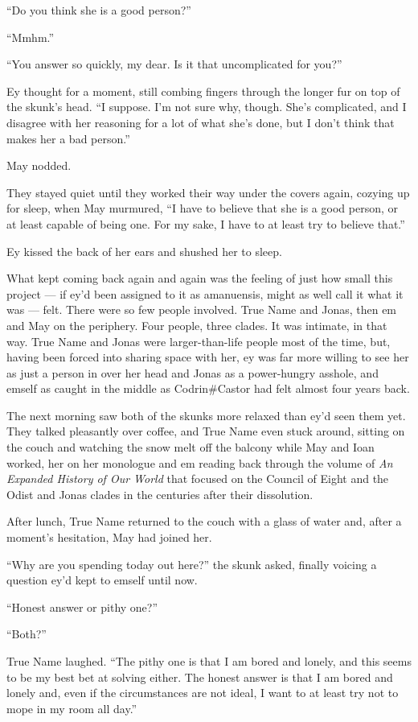 ``Do you think she is a good person?''

``Mmhm.''

``You answer so quickly, my dear. Is it that uncomplicated for you?''

Ey thought for a moment, still combing fingers through the longer fur on top of the skunk's head. ``I suppose. I'm not sure why, though. She's complicated, and I disagree with her reasoning for a lot of what she's done, but I don't think that makes her a bad person.''

May nodded.

They stayed quiet until they worked their way under the covers again, cozying up for sleep, when May murmured, ``I have to believe that she is a good person, or at least capable of being one. For my sake, I have to at least try to believe that.''

Ey kissed the back of her ears and shushed her to sleep.

What kept coming back again and again was the feeling of just how small this project — if ey'd been assigned to it as amanuensis, might as well call it what it was — felt. There were so few people involved. True Name and Jonas, then em and May on the periphery. Four people, three clades. It was intimate, in that way. True Name and Jonas were larger-than-life people most of the time, but, having been forced into sharing space with her, ey was far more willing to see her as just a person in over her head and Jonas as a power-hungry asshole, and emself as caught in the middle as Codrin\#Castor had felt almost four years back.

The next morning saw both of the skunks more relaxed than ey'd seen them yet. They talked pleasantly over coffee, and True Name even stuck around, sitting on the couch and watching the snow melt off the balcony while May and Ioan worked, her on her monologue and em reading back through the volume of \emph{An Expanded History of Our World} that focused on the Council of Eight and the Odist and Jonas clades in the centuries after their dissolution.

After lunch, True Name returned to the couch with a glass of water and, after a moment's hesitation, May had joined her.

``Why are you spending today out here?'' the skunk asked, finally voicing a question ey'd kept to emself until now.

``Honest answer or pithy one?''

``Both?''

True Name laughed. ``The pithy one is that I am bored and lonely, and this seems to be my best bet at solving either. The honest answer is that I am bored and lonely and, even if the circumstances are not ideal, I want to at least try not to mope in my room all day.''

